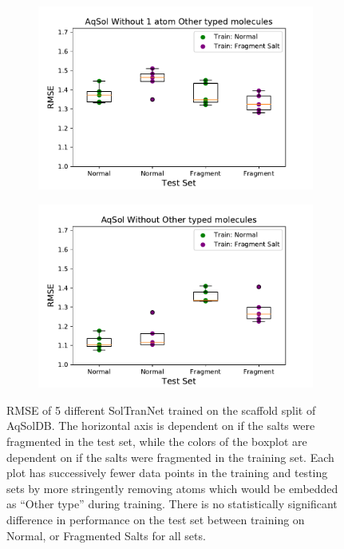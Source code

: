 \documentclass[journal=jmcmar,manuscript=article]{achemso}
\begin{document}
\begin{figure}[tb]
    \begin{subfigure}[t]{0.48\textwidth}
        \centering
        \includegraphics[width=\linewidth]{figures/others2plus_saltfragfirst_RMSEs_boxplots.pdf}
    \end{subfigure}%
    \hfill
    \begin{subfigure}[t]{0.48\textwidth}
        \centering
        \includegraphics[width=\linewidth]{figures/noothers_saltfragfirst_RMSEs_boxplots.pdf}
    \end{subfigure}
    \caption{RMSE of 5 different SolTranNet trained on the scaffold split of AqSolDB. The horizontal axis is dependent on if the salts were fragmented in the test set, while the colors of the boxplot are dependent on if the salts were fragmented in the training set. Each plot has successively fewer data points in the training and testing sets by more stringently removing atoms which would be embedded as ``Other type'' during training. There is no statistically significant difference in performance on the test set between training on Normal, or Fragmented Salts for all sets.}
    \label{fig:saltfragrmse}
\end{figure}
\end{document}
